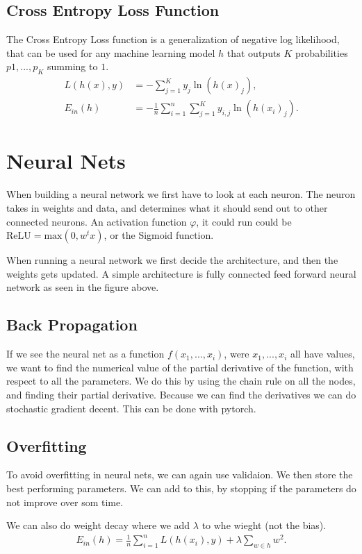 \documentclass[a4paper,oneside,article]{memoir}
\begin{document}
\newpage
\section{Cross Entropy Loss Function}
The Cross Entropy Loss function is a generalization of negative log likelihood, that can be used for any 
machine learning model $h$ that outputs $K$ probabilities $p1,...,p_K$ summing to $1$. 
\begin{align*}
    L(h(x), y) &= - \sum_{j=1}^{K}y_j\ln(h(x)_j), \\
    E_{in}(h) &= -\frac{1}{n}\sum_{i=1}^{n}\sum_{j=1}^{K}y_{i,j}\ln(h(x_i)_j). 
\end{align*}


\chapter{Neural Nets}
When building a neural network we first have to look at each neuron. 
The neuron takes in weights and data, and determines what it should send out to other connected neurons. 
An activation function $φ$, it could run could be $\text{ReLU} = \text{max}(0, w^tx)$, or the Sigmoid function.

When running a neural network we first decide the architecture, and then the weights gets updated. 
A simple architecture is fully connected feed forward neural network as seen in the figure above. 

\section{Back Propagation}
If we see the neural net as a function $f(x_1, ..., x_i)$, 
were $x_1,...,x_i$ all have values, we want to find the numerical value of the partial derivative of the function, 
with respect to all the parameters. 
We do this by using the chain rule on all the nodes, and finding their partial derivative. 
Because we can find the derivatives we can do stochastic gradient decent. 
This can be done with pytorch.  

\section{Overfitting}
To avoid overfitting in neural nets, we can again use validaion. We then store the best performing parameters. 
We can add to this, by stopping if the parameters do not improve over som time. 

We can also do weight decay where we add $λ$ to whe wieght (not the bias). 
\begin{align*}
    E_{in}(h) = \frac{1}{n}\sum_{i=1}^{n}L(h(x_i), y) + λ \sum_{w\in h}w^2.
\end{align*}
\end{document}
